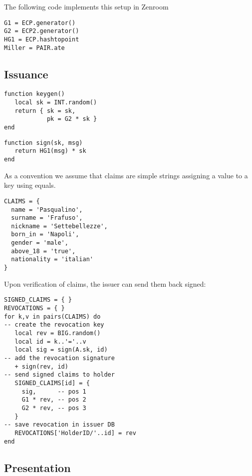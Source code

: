 \documentclass[conference]{IEEEtran}
\begin{document}
The following code implements this setup in Zenroom
\begin{lstlisting}[style=lua,caption={Setup}]
G1 = ECP.generator()
G2 = ECP2.generator()
HG1 = ECP.hashtopoint
Miller = PAIR.ate
\end{lstlisting}


\subsection{Issuance}

\begin{lstlisting}[style=lua,caption={Issuer key generation}]
function keygen()
   local sk = INT.random()
   return { sk = sk,
			pk = G2 * sk }
end
\end{lstlisting}

\begin{lstlisting}[style=lua,caption={Issuer signature}]
function sign(sk, msg)
   return HG1(msg) * sk
end
\end{lstlisting}

As a convention we assume that claims are simple strings assigning a
value to a key using equals.

\begin{lstlisting}[style=lua,caption={Holder requests signature of claims}]
CLAIMS = {
  name = 'Pasqualino',
  surname = 'Frafuso',
  nickname = 'Settebellezze',
  born_in = 'Napoli',
  gender = 'male',
  above_18 = 'true',
  nationality = 'italian'
}
\end{lstlisting}

Upon verification of claims, the issuer can send them back signed:

\begin{lstlisting}[style=lua,caption={Issuer signs claims}]
SIGNED_CLAIMS = { }
REVOCATIONS = { }
for k,v in pairs(CLAIMS) do
-- create the revocation key
   local rev = BIG.random()
   local id = k..'='..v
   local sig = sign(A.sk, id)
-- add the revocation signature
   + sign(rev, id)
-- send signed claims to holder
   SIGNED_CLAIMS[id] = {
     sig,      -- pos 1
     G1 * rev, -- pos 2
     G2 * rev, -- pos 3
   }
-- save revocation in issuer DB
   REVOCATIONS['HolderID/'..id] = rev
end
\end{lstlisting}

\subsection{Presentation}
\end{document}
